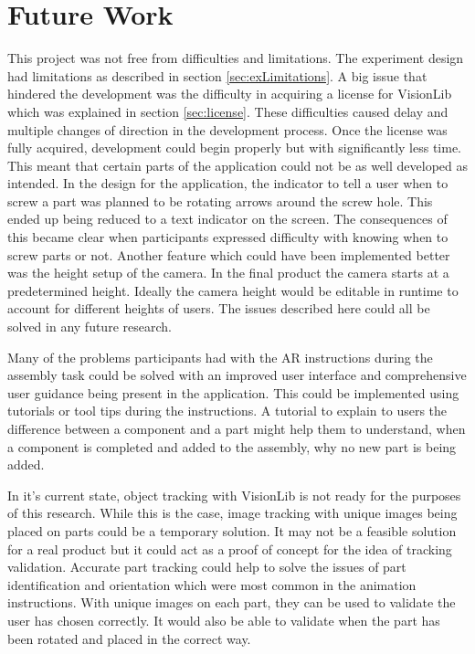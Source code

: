 \documentclass{l4proj}
\begin{document}
\section{Future Work}

This project was not free from difficulties and limitations. The experiment design had limitations as described in section \ref{sec:exLimitations}. A big issue that hindered the development was the difficulty in acquiring a license for VisionLib which was explained in section \ref{sec:license}. These difficulties caused delay and multiple changes of direction in the development process. Once the license was fully acquired, development could begin properly but with significantly less time. This meant that certain parts of the application could not be as well developed as intended. In the design for the application, the indicator to tell a user when to screw a part was planned to be rotating arrows around the screw hole. This ended up being reduced to a text indicator on the screen. The consequences of this became clear when participants expressed difficulty with knowing when to screw parts or not. Another feature which could have been implemented better was the height setup of the camera. In the final product the camera starts at a predetermined height. Ideally the camera height would be editable in runtime to account for different heights of users. The issues described here could all be solved in any future research.

Many of the problems participants had with the AR instructions during the assembly task could be solved with an improved user interface and comprehensive user guidance being present in the application. This could be implemented using tutorials or tool tips during the instructions. A tutorial to explain to users the difference between a component and a part might help them to understand, when a component is completed and added to the assembly, why no new part is being added.

In it's current state, object tracking with VisionLib is not ready for the purposes of this research. While this is the case, image tracking with unique images being placed on parts could be a temporary solution. It may not be a feasible solution for a real product but it could act as a proof of concept for the idea of tracking validation. Accurate part tracking could help to solve the issues of part identification and orientation which were most common in the animation instructions. With unique images on each part, they can be used to validate the user has chosen correctly. It would also be able to validate when the part has been rotated and placed in the correct way.
\end{document}
